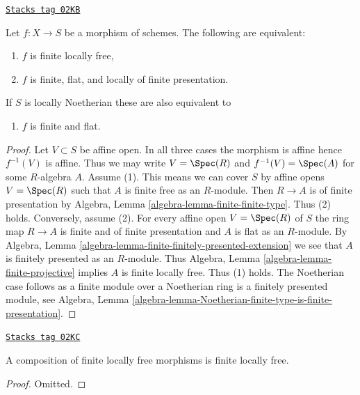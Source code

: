 \begin{lemma}
\label{morphisms-lemma-finite-flat}
\href{https://stacks.math.columbia.edu/tag/02KB}{\texttt{Stacks tag 02KB}}

Let $f : X \to S$ be a morphism of schemes.
The following are equivalent:
\begin{enumerate}
\item $f$ is finite locally free,
\item $f$ is finite, flat, and locally of finite presentation.
\end{enumerate}
If $S$ is locally Noetherian these are also equivalent to
\begin{enumerate}
\item[(3)] $f$ is finite and flat.
\end{enumerate}
\end{lemma}

\begin{proof}
Let $V \subset S$ be affine open. In all three cases
the morphism is affine hence $f^{-1}(V)$ is affine.
Thus we may write $V = \Spec(R)$ and $f^{-1}(V) = \Spec(A)$
for some $R$-algebra $A$.
Assume (1). This means we can cover $S$ by affine opens
$V = \Spec(R)$ such that $A$ is finite free as an $R$-module.
Then $R \to A$ is of finite presentation by
Algebra, Lemma \ref{algebra-lemma-finite-finite-type}.
Thus (2) holds. Conversely, assume (2).
For every affine open $V = \Spec(R)$ of $S$ the ring map
$R \to A$ is finite and of finite presentation and $A$ is flat
as an $R$-module. By
Algebra, Lemma \ref{algebra-lemma-finite-finitely-presented-extension}
we see that $A$ is finitely presented as an $R$-module.
Thus Algebra, Lemma \ref{algebra-lemma-finite-projective}
implies $A$ is finite locally free. Thus (1) holds.
The Noetherian case follows as a finite module over a Noetherian ring
is a finitely presented module, see Algebra,
Lemma \ref{algebra-lemma-Noetherian-finite-type-is-finite-presentation}.
\end{proof}

\begin{lemma}
\label{morphisms-lemma-composition-finite-locally-free}
\href{https://stacks.math.columbia.edu/tag/02KC}{\texttt{Stacks tag 02KC}}

A composition of finite locally free morphisms is finite locally free.
\end{lemma}

\begin{proof}
Omitted.
\end{proof}

